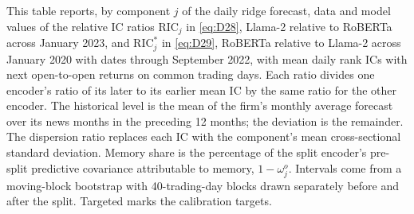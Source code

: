 \documentclass[11pt,letterpaper]{article}
\theoremstyle{remark}
\begin{document}
\begin{table}[htbp]
\centering
\caption{Relative IC Ratios across the Pretraining Cutoffs}
\label{tab:tab12}
\begin{minipage}{\linewidth}\footnotesize
This table reports, by component $j$ of the daily ridge forecast, data and model values of the relative IC ratios $\mathrm{RIC}_j$ in \eqref{eq:D28}, Llama-2 relative to RoBERTa across January 2023, and $\mathrm{RIC}_j^*$ in \eqref{eq:D29}, RoBERTa relative to Llama-2 across January 2020 with dates through September 2022, with mean daily rank ICs with next open-to-open returns on common trading days. Each ratio divides one encoder's ratio of its later to its earlier mean IC by the same ratio for the other encoder. The historical level is the mean of the firm's monthly average forecast over its news months in the preceding 12 months; the deviation is the remainder. The dispersion ratio replaces each IC with the component's mean cross-sectional standard deviation. Memory share is the percentage of the split encoder's pre-split predictive covariance attributable to memory, $1-\omega_j^o$. Intervals come from a moving-block bootstrap with 40-trading-day blocks drawn separately before and after the split. Targeted marks the calibration targets.
\end{minipage}
\medskip


\end{table}
\end{document}

